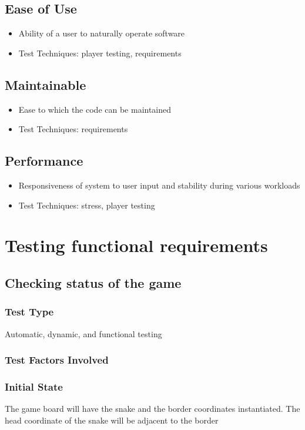 \documentclass[12pt]{article}
\begin{document}
\subsection{Ease of Use}
\begin{itemize}
\item Ability of a user to naturally operate software
\item Test Techniques: player testing, requirements
\end{itemize}

\subsection{Maintainable}
\begin{itemize}
\item Ease to which the code can be maintained
\item Test Techniques: requirements
\end{itemize}

\subsection{Performance}
\begin{itemize}
\item Responsiveness of system to user input and stability during various workloads
\item Test Techniques: stress, player testing
\end{itemize}


\section{Testing functional requirements}

\noindent
\subsection{Checking status of the game}
\subsubsection*{Test Type}
Automatic, dynamic, and functional testing
\subsubsection*{Test Factors Involved}
\subsubsection*{Initial State}
The game board will have the snake and the border coordinates instantiated. The head coordinate of the snake will be adjacent to the border 
\end{document}
